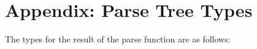 \section*{Appendix: Parse Tree Types}

The types for the result of the parse function are as follows:


